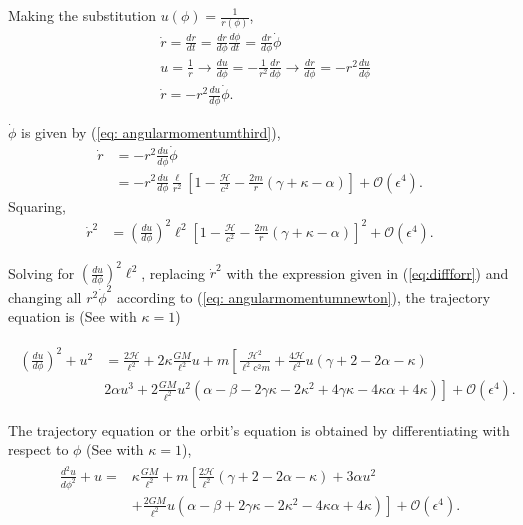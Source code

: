 Making the substitution $u(\phi) = \frac{1}{r(\phi)}$,
\begin{align*}
	&\dot{r} = \frac{dr}{dt} = \frac{dr}{d\phi} \frac{d\phi}{dt} = \frac{dr}{d\phi}\dot{\phi}\\
	&u = \frac{1}{r} \rightarrow \frac{du}{d\phi} = -\frac{1}{r^2} \frac{dr}{d\phi} \rightarrow \frac{dr}{d\phi} = -r^2\frac{du}{d\phi}\\
	&\dot{r} =  -r^2\frac{du}{d\phi}\dot{\phi}.
\end{align*}

$\dot{\phi}$ is given by (\ref{eq: angularmomentumthird}),
\begin{align*}
	\dot{r} &=  -r^2\frac{du}{d\phi}\dot{\phi}\\
	&=  -r^2\frac{du}{d\phi}\frac{\ell}{r^2}\left[1-\frac{\mathcal{H}}{c^2}-\frac{2m}{r}\left(\gamma+\kappa-\alpha\right)\right]+\mathcal{O}(\epsilon^4).
\end{align*}
Squaring,
\begin{align*}
	\dot{r}^2&=  \left(\frac{du}{d\phi}\right)^2 \ell^2 \left[1-\frac{\mathcal{H}}{c^2}-\frac{2m}{r}\left(\gamma+\kappa-\alpha\right)\right]^2+\mathcal{O}(\epsilon^4).
\end{align*}

Solving for $\left(\frac{du}{d\phi}\right)^2 \ell^2$, replacing $\dot{r}^2$ with the expression given in (\ref{eq:diffforr}) and changing all $r^2\dot{\phi}^2$ according to (\ref{eq: angularmomentumnewton}), the trajectory equation is (See \cite{Brumberg} with $\kappa = 1$)

\begin{align}
\label{eq: differentialequation1}
\begin{split}
\left(\frac{du}{d\phi}\right)^2 + u^2 &= \frac{2\mathcal{H}}{\ell^2}+2\kappa\frac{GM}{\ell^2}u + m\left[\frac{\mathcal{H}^2}{\ell^2c^2m}+\frac{4\mathcal{H}}{\ell^2}u(\gamma+2-2\alpha-\kappa)\right.\\
&\left.2\alpha u^3 + 2\frac{GM}{\ell^2}u^2(\alpha-\beta-2\gamma\kappa - 2\kappa^2 + 4\gamma\kappa - 4\kappa\alpha+4\kappa)\right]+\mathcal{O}(\epsilon^4).
\end{split}
\end{align}

The trajectory equation or the orbit's equation is obtained by differentiating with respect to $\phi$ (See \cite{Brumberg} with $\kappa = 1$),
\begin{align}
\begin{split}
\frac{d^2u}{d\phi^2}+u = &\kappa\frac{GM}{\ell^2}+m\left[\frac{2\mathcal{H}}{\ell^2}(\gamma+2-2\alpha-\kappa)+3\alpha u^2 \right. \\
&\left.+\frac{2GM}{\ell^2}u(\alpha-\beta + 2\gamma\kappa - 2\kappa^2 - 4\kappa\alpha + 4\kappa)\right]+\mathcal{O}(\epsilon^4).
\end{split}
\end{align}

